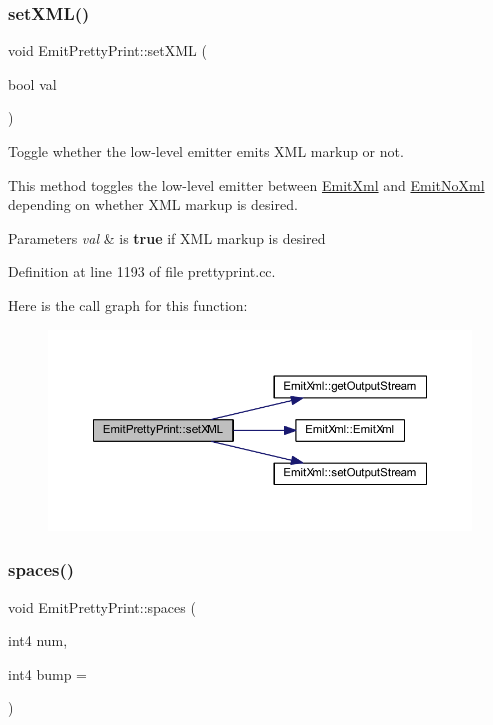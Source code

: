 \subsubsection{\texorpdfstring{setXML()}{setXML()}}
{\footnotesize\ttfamily void Emit\+Pretty\+Print\+::set\+X\+ML (\begin{DoxyParamCaption}\item[{bool}]{val }\end{DoxyParamCaption})}



Toggle whether the low-\/level emitter emits X\+ML markup or not. 

This method toggles the low-\/level emitter between \mbox{\hyperlink{class_emit_xml}{Emit\+Xml}} and \mbox{\hyperlink{class_emit_no_xml}{Emit\+No\+Xml}} depending on whether X\+ML markup is desired. 
\begin{DoxyParams}{Parameters}
{\em val} & is {\bfseries{true}} if X\+ML markup is desired \\
\hline
\end{DoxyParams}


Definition at line 1193 of file prettyprint.\+cc.

Here is the call graph for this function\+:
\nopagebreak
\begin{figure}[H]
\begin{center}
\leavevmode
\includegraphics[width=350pt]{class_emit_pretty_print_a6807c90766479cc6c03c8b0c40a8708f_cgraph}
\end{center}
\end{figure}
\mbox{\label{class_emit_pretty_print_aef02e9261ce7b7a96bceeae169512a3f}} 
\subsubsection{\texorpdfstring{spaces()}{spaces()}}
{\footnotesize\ttfamily void Emit\+Pretty\+Print\+::spaces (\begin{DoxyParamCaption}\item[{int4}]{num,  }\item[{int4}]{bump = {} }\end{DoxyParamCaption})\hspace{0.3cm}{\ttfamily [virtual]}}



